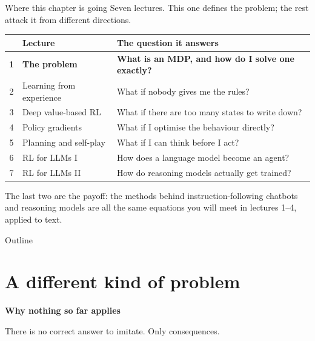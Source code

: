 \documentclass[aspectratio=169]{beamer}
\begin{document}
\begin{frame}{Where this chapter is going}
  \small
  Seven lectures. This one defines the problem; the rest attack it from different directions.

  \vskip 8pt
  \begin{center}
  \footnotesize
  \begin{tabular}{c l l}
    \toprule
    & \textbf{Lecture} & \textbf{The question it answers} \\
    \midrule
    \textbf{1} & \textbf{The problem} & \textbf{What is an MDP, and how do I solve one exactly?} \\
    2 & Learning from experience & What if nobody gives me the rules? \\
    3 & Deep value-based RL & What if there are too many states to write down? \\
    4 & Policy gradients & What if I optimise the behaviour directly? \\
    5 & Planning and self-play & What if I can think before I act? \\
    6 & RL for LLMs I & How does a language model become an agent? \\
    7 & RL for LLMs II & How do reasoning models actually get trained? \\
    \bottomrule
  \end{tabular}
  \end{center}

  \vskip 10pt
  \begin{tcolorbox}[colback=armblue!8, colframe=armblue, boxrule=0.6pt, arc=2pt]
    \small
    The last two are the payoff: the methods behind instruction-following chatbots and reasoning
    models are all the same equations you will meet in lectures 1--4, applied to text.
  \end{tcolorbox}
\end{frame}

\begin{frame}{Outline}
  \tableofcontents
\end{frame}

\section{A different kind of problem}
\begin{frame}[plain]
  \begin{center}
    \vskip 1.6cm
    {\Huge\bfseries\color{popblue}Why nothing so far applies}

    \vskip 0.6cm
    {\large There is no correct answer to imitate. Only consequences.}
  \end{center}
\end{frame}
\end{document}
